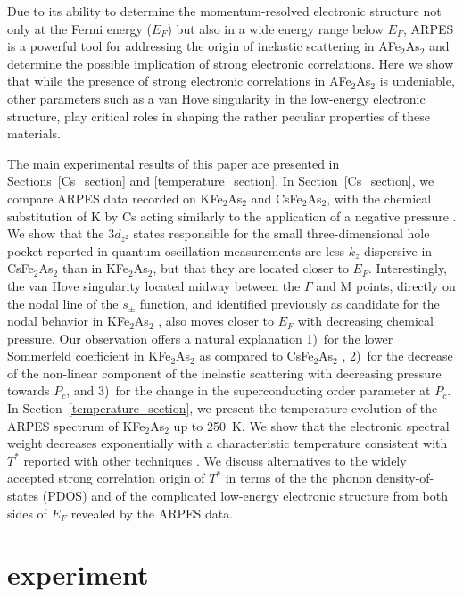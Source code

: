 \documentclass[twocolumn,aps,showpacs,preprintnumbers,amsmath,amssymb, superscriptaddress,longbibliography]{revtex4-1}
\begin{document}
Due to its ability to determine the momentum-resolved electronic structure not only at the Fermi energy ($E_F$) but also in a wide energy range below $E_F$, ARPES is a powerful tool for addressing the origin of inelastic scattering in AFe$_2$As$_2$ and determine the possible implication of strong electronic correlations. Here we show that while the presence of strong electronic correlations in AFe$_2$As$_2$ is undeniable, other parameters such as a van Hove singularity in the low-energy electronic structure, play critical roles in shaping the rather peculiar properties of these materials. 

The main experimental results of this paper are presented in Sections~\ref{Cs_section} and \ref{temperature_section}. In Section~\ref{Cs_section}, we compare ARPES data recorded on KFe$_2$As$_2$ and CsFe$_2$As$_2$, with the chemical substitution of K by Cs acting similarly to the application of a negative pressure \cite{Tafti_PRB89,Tafti_PRB91}. We show that the 3$d_{z^2}$ states responsible for the small three-dimensional hole pocket reported in quantum oscillation measurements \cite{JPSConf2014_Zocco} are less $k_z$-dispersive in CsFe$_2$As$_2$ than in KFe$_2$As$_2$, but that they are located closer to $E_F$. Interestingly, the van Hove singularity located midway between the $\Gamma$ and M points, directly on the nodal line of the $s_{\pm}$ function, and identified previously as candidate for the nodal behavior in KFe$_2$As$_2$ \cite{DL_Fang_vHs}, also moves closer to $E_F$ with decreasing chemical pressure. Our observation offers a natural explanation 1)~for the lower Sommerfeld coefficient in KFe$_2$As$_2$ as compared to CsFe$_2$As$_2$ \cite{Abdel-HafiezPRB85,AF_WangPRB87,Hardy_PRB94,Eilers_PRL116}, 2)~for the decrease of the non-linear component of the inelastic scattering with decreasing pressure towards $P_c$, and 3)~for the change in the superconducting order parameter at $P_c$. In Section~\ref{temperature_section}, we present the temperature evolution of the ARPES spectrum of KFe$_2$As$_2$ up to 250~K. We show that the electronic spectral weight decreases exponentially with a characteristic temperature consistent with $T^*$ reported with other techniques \cite{YP_Wu_PRL116, Wiecki_PRB97}. We discuss alternatives to the widely accepted strong correlation origin of $T^*$ in terms of the the phonon density-of-states (PDOS) and of the complicated low-energy electronic structure from both sides of $E_F$ revealed by the ARPES data. 

\section{experiment}
\end{document}
